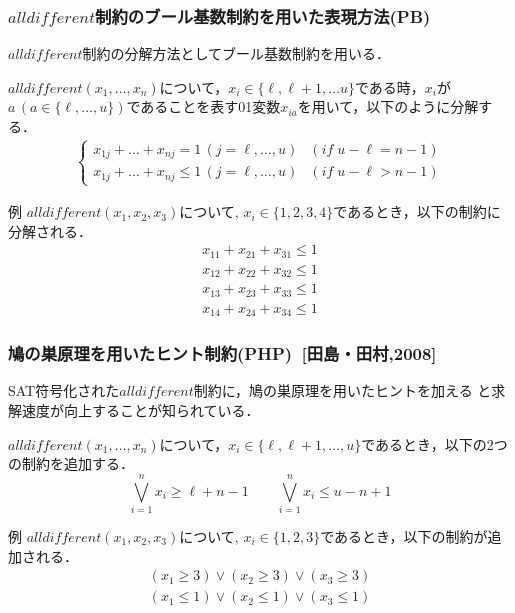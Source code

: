 \documentclass [dvipdfmx,11pt]{beamer}
\newcommand{\alldifferent}{$alldifferent$}
\begin{document}
\begin{frame}
    \frametitle{{\alldifferent}制約のブール基数制約を用いた表現方法(PB)}
    {\alldifferent}制約の分解方法としてブール基数制約を用いる．
    \begin{block}{}
        $alldifferent(x_1,\dots,x_n)$について，$x_i \in \{\ell,\ell+1,\dots u\}$である時，$x_i$が$a \, (a \in \{\ell, \dots, u\})$であることを表す01変数$x_{ia}$を用いて，以下のように分解する．
        \vspace{-3mm}
        \begin{eqnarray*}
            \begin{cases}
                x_{1j} + \dots + x_{nj} = 1 \, (j=\ell,\dots,u)    & (if \; u-\ell = n-1) \\
                x_{1j} + \dots + x_{nj} \leq 1 \, (j=\ell,\dots,u) & (if \; u-\ell > n-1)
            \end{cases}
        \end{eqnarray*}
    \end{block}
    \begin{exampleblock}{例}
        $alldifferent(x_1, x_2, x_3)$について, $x_i \in \{1,2,3,4\}$であるとき，以下の制約に分解される．
        \vspace{-3mm}
        \begin{eqnarray*}
            x_{11} + x_{21} + x_{31} \leq 1 \\
            x_{12} + x_{22} + x_{32} \leq 1 \\
            x_{13} + x_{23} + x_{33} \leq 1 \\
            x_{14} + x_{24} + x_{34} \leq 1
        \end{eqnarray*}
    \end{exampleblock}
\end{frame}


\begin{frame}
    \frametitle{鳩の巣原理を用いたヒント制約(PHP)~[田島・田村,2008]}
    SAT符号化された{\alldifferent}制約に，鳩の巣原理を用いたヒントを加える
    と求解速度が向上することが知られている．
    \begin{block}{}
        $alldifferent(x_{1},\ldots,x_{n})$について，$x_i \in
        \{\ell,\ell+1,\ldots,u\}$であるとき，以下の2つの制約を追加する．
        \[
            \bigvee_{i=1}^{n}x_{i}\geq \ell+n-1 \qquad
            \bigvee_{i=1}^{n}x_{i}\leq u-n+1
        \]
    \end{block}
    \begin{exampleblock}{例}
        $alldifferent(x_1, x_2, x_3)$について, $x_i \in \{1,2,3\}$であるとき，以下の制約が追加される．
        \vspace{-3mm}
        \begin{eqnarray*}
            (x_1\geq 3) \lor (x_2 \geq 3) \lor (x_3 \geq 3)\\
            (x_1\leq 1) \lor (x_2 \leq 1) \lor (x_3 \leq 1)
        \end{eqnarray*}
    \end{exampleblock}
\end{frame}
\end{document}
